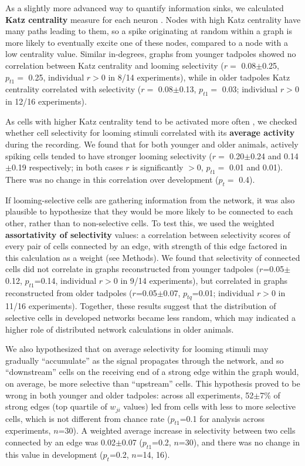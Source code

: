 \documentclass{article}
\begin{document}
As a slightly more advanced way to quantify information sinks, we calculated \textbf{Katz centrality} measure for each neuron \citep{katz1953original,fletcher2018katz}. Nodes with high Katz centrality have many paths leading to them, so a spike originating at random within a graph is more likely to eventually excite one of these nodes, compared to a node with a low centrality value. Similar in-degrees, graphs from younger tadpoles showed no correlation between Katz centrality and looming selectivity ($r =$ 0.08$\pm$0.25, $p_{t1} =$ 0.25, individual $r>$0 in 8/14 experiments), while in older tadpoles Katz centrality correlated with selectivity ($r=$ 0.08$\pm$0.13, $p_{t1}=$ 0.03; individual $r>$0 in 12/16 experiments).

As cells with higher Katz centrality tend to be activated more often \citep{fletcher2018katz}, we checked whether cell selectivity for looming stimuli correlated with its \textbf{average activity} during the recording. We found that for both younger and older animals, actively spiking cells tended to have stronger looming selectivity ($r =$ 0.20$\pm$0.24 and 0.14$\pm$0.19 respectively; in both cases $r$ is significantly $>0$, $p_{t1}=$ 0.01 and 0.01). There was no change in this correlation over development ($p_t=$ 0.4).

If looming-selective cells are gathering information from the network, it was also plausible to hypothesize that they would be more likely to be connected to each other, rather than to non-selective cells. To test this, we used the weighted \textbf{assortativity of selectivity} values: a correlation between selectivity scores of every pair of cells connected by an edge, with strength of this edge factored in this calculation as a weight (see Methods). We found that selectivity of connected cells did not correlate in graphs reconstructed from younger tadpoles ($r$=0.05$\pm$0.12, $p_{t1}$=0.14, individual $r>$0 in 9/14 experiments), but correlated in graphs reconstructed from older tadpoles ($r$=0.05$\pm$0.07, $p_{tq}$=0.01; individual $r>$0 in 11/16 experiments). Together, these results suggest that the distribution of selective cells in developed networks became less random, which may indicated a higher role of distributed network calculations in older animals.

We also hypothesized that on average selectivity for looming stimuli may gradually “accumulate” as the signal propagates through the network, and so “downstream” cells on the receiving end of a strong edge within the graph would, on average, be more selective than “upstream” cells. This hypothesis proved to be wrong in both younger and older tadpoles: across all experiments, 52$\pm$7\% of strong edges (top quartile of $w_{ji}$ values) led from cells with less to more selective cells, which is not different from chance rate ($p_{t1}$=0.1 for analysis across experiments, $n$=30). A weighted average increase in selectivity between two cells connected by an edge was 0.02$\pm$0.07 ($p_{t1}$=0.2, $n$=30), and there was no change in this value in development ($p_t$=0.2, $n$=14, 16).
\end{document}
